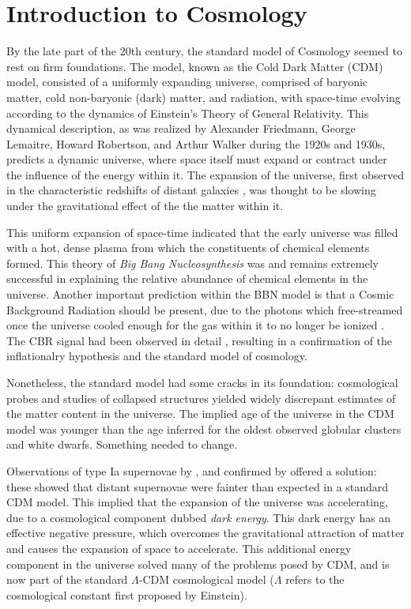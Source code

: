 \chapter{Introduction to Cosmology}

By the late part of the 20th century, the standard model of Cosmology
seemed to rest on firm foundations.  The model, known as the Cold Dark Matter
(CDM) model, consisted of a uniformly
expanding universe, comprised of baryonic matter, cold
non-baryonic (dark) matter, and radiation, with space-time evolving
according to the dynamics of Einstein's Theory of General Relativity.
This dynamical description, as was realized by Alexander Friedmann,
George Lemaitre, Howard Robertson, and Arthur Walker during the
1920s and 1930s,
predicts a dynamic universe, where space itself must expand or contract
under the influence of the energy within it.  The expansion of the universe,
first observed in the characteristic redshifts of distant galaxies
\citep{hubble1929}, was thought to be slowing under the
gravitational effect of the the matter within it.

This uniform expansion of space-time indicated that the early universe
was filled with a hot, dense plasma from which the constituents of
chemical elements
formed.  This theory of {\it Big Bang Nucleosynthesis} \citep[BBN:][]{Alpher48}
was and remains extremely successful in explaining the relative
abundance of chemical elements in the universe.  Another important prediction
within the BBN model is that a Cosmic Background Radiation should be present,
due to the photons which free-streamed once the universe cooled enough for
the gas within it to no longer be ionized \citep{Alpher48b}.
The CBR signal had been observed in detail \citep{Smoot92},
resulting in a confirmation of the inflationalry
hypothesis and the standard model of cosmology.

Nonetheless, the standard model had some cracks in its foundation:
cosmological probes and
studies of collapsed structures yielded widely discrepant estimates of the
matter content in the universe.  The implied age of the universe in the CDM
model was younger than the age inferred for the oldest observed globular
clusters and white dwarfs.  Something needed to change.

Observations of type Ia supernovae by \citet{Riess98}, and confirmed by
\citet{Perlmutter99} offered a solution: these showed that distant supernovae
were fainter than expected in a standard CDM model.  This implied that the
expansion of the universe was accelerating, due to a cosmological component
dubbed {\it dark energy}.  This dark energy has an effective negative pressure,
which overcomes the gravitational attraction of matter and causes the
expansion of space to accelerate.  This additional energy component in the
universe solved many of the problems posed by CDM, and is now part of the
standard $\Lambda$-CDM cosmological model ($\Lambda$ refers to the cosmological
constant first proposed by Einstein).

